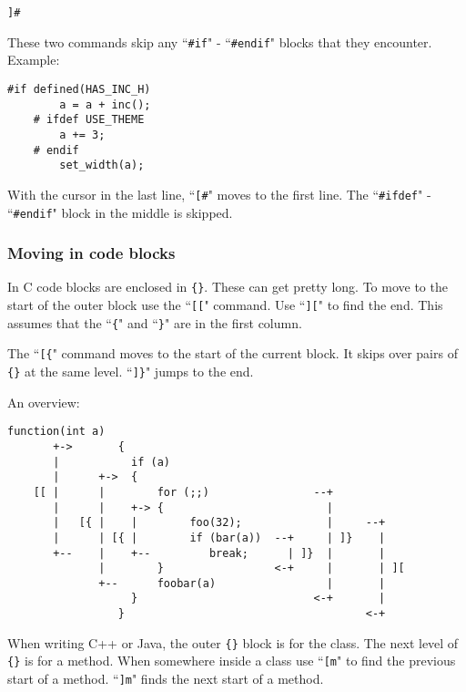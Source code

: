 \begin{Verbatim}[samepage=true]
 ]#
\end{Verbatim}

These two commands skip any ``\texttt{\#if}" - ``\texttt{\#endif}" blocks that they encounter.
Example:

\begin{Verbatim}[samepage=true]
    #if defined(HAS_INC_H)
        a = a + inc();
    # ifdef USE_THEME
        a += 3;
    # endif
        set_width(a);
\end{Verbatim}

With the cursor in the last line, ``\texttt{[\#}" moves to the first line.
The ``\texttt{\#ifdef}" - ``\texttt{\#endif}" block in the middle is skipped.
\subsubsection{Moving in code blocks}
In C code blocks are enclosed in \texttt{\{\}}.
These can get pretty long.
To move to the start of the outer block use the ``\texttt{[[}" command.
Use ``\texttt{][}" to find the end.
This assumes that the ``\texttt{\{}" and ``\texttt{\}}" are in the first column.

The ``\texttt{[\{}" command moves to the start of the current block.
It skips over pairs of \texttt{\{\}} at the same level.
``\texttt{]\}}" jumps to the end.

An overview:

\begin{Verbatim}[samepage=true]
                 function(int a)
       +->       {
       |           if (a)
       |      +->  {
    [[ |      |        for (;;)                --+
       |      |    +-> {                         |
       |   [{ |    |        foo(32);             |     --+
       |      | [{ |        if (bar(a))  --+     | ]}    |
       +--    |    +--         break;      | ]}  |       |
              |        }                 <-+     |       | ][
              +--      foobar(a)                 |       |
                   }                           <-+       |
                 }                                     <-+
\end{Verbatim}

When writing C++ or Java, the outer \texttt{\{\}} block is for the class.
The next level of \texttt{\{\}} is for a method.
When somewhere inside a class use ``\texttt{[m}" to find the previous start of a method.
``\texttt{]m}" finds the next start of a method.

